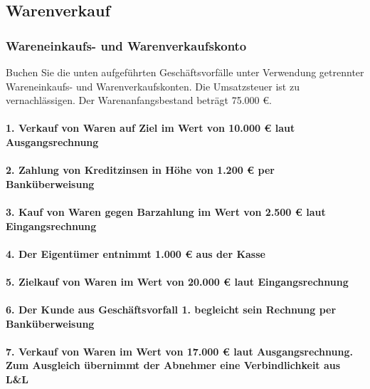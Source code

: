\documentclass[paper=a4, fontsize=11pt]{scrartcl}
\numberwithin{equation}{section}
\numberwithin{figure}{section}
\numberwithin{table}{section}
\begin{document}
\subsection{Warenverkauf}
\subsubsection{Wareneinkaufs- und Warenverkaufskonto}
Buchen Sie die unten aufgeführten Geschäftsvorfälle unter Verwendung getrennter Wareneinkaufs- und Warenverkaufskonten. Die Umsatzsteuer ist zu vernachlässigen. Der Warenanfangsbestand beträgt 75.000 €. \\
 
\paragraph{1. Verkauf von Waren auf Ziel im Wert von 10.000 € laut Ausgangsrechnung}

\paragraph{2. Zahlung von Kreditzinsen in Höhe von 1.200 € per Banküberweisung}

\paragraph{3. Kauf von Waren gegen Barzahlung im Wert von 2.500 € laut Eingangsrechnung}

\paragraph{4. Der Eigentümer entnimmt 1.000 € aus der Kasse}

\paragraph{5. Zielkauf von Waren im Wert von 20.000 € laut Eingangsrechnung}

\paragraph{6. Der Kunde aus Geschäftsvorfall 1. begleicht sein Rechnung per Banküberweisung}

\paragraph{7. Verkauf von Waren im Wert von 17.000 € laut Ausgangsrechnung. Zum Ausgleich übernimmt der Abnehmer eine Verbindlichkeit aus L&L}
\end{document}
